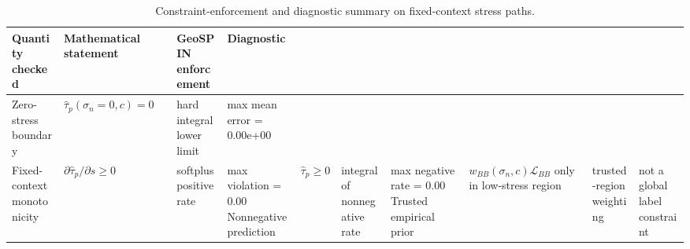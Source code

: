 \begin{table}
\caption{Constraint-enforcement and diagnostic summary on fixed-context stress paths.}
\label{tab:constraint_checks}
\begin{tabular}{llll}
\toprule
Quantity checked & Mathematical statement & GeoSPIN enforcement & Diagnostic \\
\midrule
Zero-stress boundary & $\hat{\tau}_p(\sigma_n=0,c)=0$ & hard integral lower limit & max mean error = 0.00e+00 \\
Fixed-context monotonicity & $\partial \hat{\tau}_p/\partial s \ge 0$ & softplus positive rate & max violation = 0.00%
Nonnegative prediction & $\hat{\tau}_p\ge0$ & integral of nonnegative rate & max negative rate = 0.00%
Trusted empirical prior & $w_{BB}(\sigma_n,c)\mathcal{L}_{BB}$ only in low-stress region & trusted-region weighting & not a global label constraint \\
\bottomrule
\end{tabular}
\end{table}
